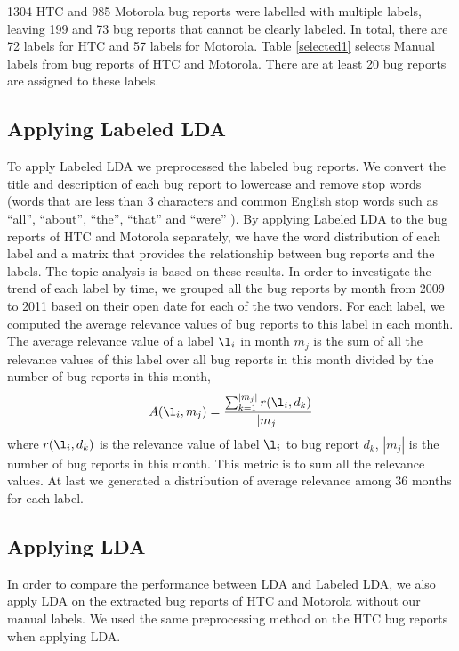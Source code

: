 \documentclass[10pt, conference, compsocconf]{IEEEtran}
\begin{document}
1304 HTC and 985 Motorola bug reports were labelled with multiple
labels, leaving 199 and 73 bug reports that cannot be clearly labeled.
In total, there are 72 labels for HTC and 57 labels for Motorola.
Table \ref{selected1} selects Manual labels from bug reports of HTC
and Motorola.  
There are at least 20 bug reports are assigned to these
labels.


\subsection{Applying Labeled LDA}
To apply Labeled LDA we preprocessed the labeled bug reports. We convert the title and description of each bug report to lowercase and remove stop words (words that are less than 3 characters and common English stop words such as ``all'', ``about'', ``the'', ``that'' and ``were'' ).
By applying Labeled LDA to the bug reports of HTC and Motorola separately, we have the word distribution of each label and a matrix that provides the relationship between bug reports and the labels. The topic analysis is based on these results. In order to investigate the trend of each label by time, we grouped all the bug reports by month from 2009 to 2011 based on their open date for each of the two vendors. For each label, we computed the average relevance values of bug reports to this label in each month. The average relevance value of a label \begin{math} \l_i \end{math} in month \begin{math} m_j \end{math} is the sum of all the relevance values of this label over all bug reports in this month divided by the number of bug reports in this month,
\begin{equation}
A(\l_i,m_j) = \frac{\sum_{\substack{k=1}}^{|m_j|}r(\l_i,d_k)}{|m_j|}
\end{equation}
where $r(\l_i,d_k)$ is the relevance value of label $\l_i$ to bug report $d_k$, $|m_j|$ is the number of bug reports in this month. This metric is to sum all the relevance values. At last we generated a distribution of average relevance among 36 months for each label.

\subsection{Applying LDA}
In order to compare the performance between LDA and Labeled LDA, we also apply LDA on the extracted bug reports of HTC and Motorola without our manual labels. We used the same preprocessing method on the HTC bug reports when applying LDA. 
\end{document}

